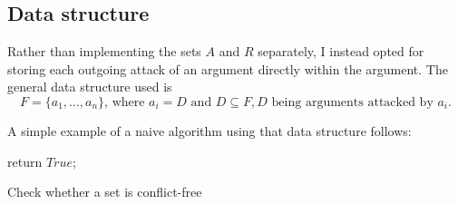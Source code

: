 \documentclass[draft,final]{vutinfth} %
\newcommand{\hl}{\par\vspace{6pt}} %
\begin{document}
\subsection{Data structure}
Rather than implementing the sets $A$ and $R$ separately, I instead opted for storing each outgoing attack of an argument directly within the argument. The general data structure used is\\
\[F=\{a_1,...,a_n\} \text{, where } a_i=D \text{ and } D\subseteq F, D \text{ being arguments attacked by } a_i.\]\hl

A simple example of a naive algorithm using that data structure follows:\hl

\begin{algorithm}[H]
 return $True$;
 \caption{Check whether a set is conflict-free}
\end{algorithm}\hl

\backmatter




\printindex

\printglossaries
\end{document}
